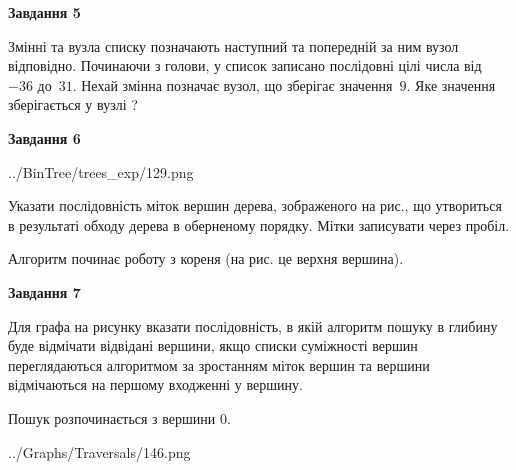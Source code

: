 \documentclass[12pt, ukrainian]{article}
\begin{document}
{\begin {large}
{\begin {center}\textbf{Завдання 5}\end {center}}\par
Змінні  та  вузла списку позначають наступний та попередній за ним вузол відповідно. Починаючи з голови, у список записано послідовні цілі числа від~$-36$ до~$31$. Нехай змінна  позначає вузол, що зберігає значення~$9$.
Яке значення зберігається у вузлі  ?\par
\newpage

{\begin {center}\textbf{Завдання 6}\end {center}}\par

\begin{center}
	{../BinTree/trees_exp/129.png}
\end{center}
Указати послідовність міток вершин дерева, зображеного на рис., що утвориться в результаті обходу дерева в оберненому порядку. Мітки записувати через пробіл.\par Алгоритм починає роботу з кореня (на рис. це верхня вершина).\par
\newpage

{\begin {center}\textbf{Завдання 7}\end {center}}\par
Для графа на рисунку вказати послідовність, в якій алгоритм пошуку в глибину буде відмічати відвідані вершини, якщо списки суміжності вершин переглядаються алгоритмом за зростанням міток вершин та вершини відмічаються на першому вход\-женні у вершину.\par
Пошук розпочинається з вершини 0.\par

\begin{center}
	{../Graphs/Traversals/146.png}
\end{center}\par
\newpage


\end{large}}
\end{document}
